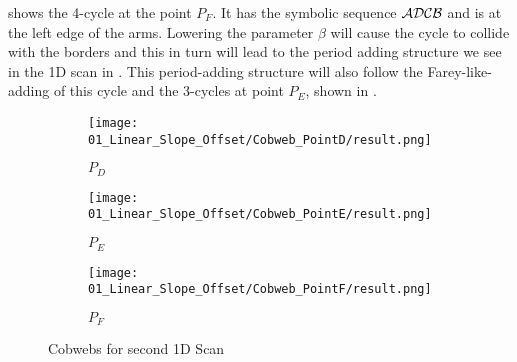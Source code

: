  shows the 4-cycle at the point $P_F$.
It has the symbolic sequence $\mathcal{A}\mathcal{D}\mathcal{C}\mathcal{B}$ and is at the left edge of the arms.
Lowering the parameter $\beta$ will cause the cycle to collide with the borders and this in turn will lead to the period adding structure we see in the 1D scan in .
This period-adding structure will also follow the Farey-like-adding of this cycle and the 3-cycles at point $P_E$, shown in .

\begin{figure}
    \centering
    \begin{subfigure}{0.3\textwidth}
        \centering
        \texttt{[image: 01\_Linear\_Slope\_Offset/Cobweb\_PointD/result.png]}
        \caption{$P_D$}
        \label{fig:pcw.lin.CobwebD}
    \end{subfigure}
    \begin{subfigure}{0.3\textwidth}
        \centering
        \texttt{[image: 01\_Linear\_Slope\_Offset/Cobweb\_PointE/result.png]}
        \caption{$P_E$}
        \label{fig:pcw.lin.CobwebE}
    \end{subfigure}
    \begin{subfigure}{0.3\textwidth}
        \centering
        \texttt{[image: 01\_Linear\_Slope\_Offset/Cobweb\_PointF/result.png]}
        \caption{$P_F$}
        \label{fig:pcw.lin.CobwebF}
    \end{subfigure}
    \caption{Cobwebs for second 1D Scan}
    \label{fig:pcw.lin.CobwebD-F}
\end{figure}
